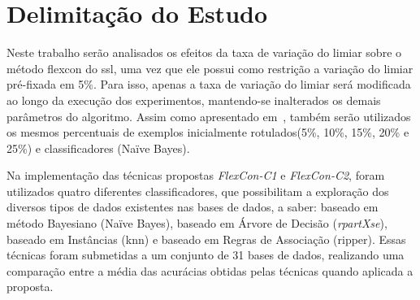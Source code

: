 \section{Delimitação do Estudo}
    \label{sec:delimitacao-estudo}


    Neste trabalho serão analisados os efeitos da taxa de variação do limiar sobre o método \ac{flexcon} do \ac{ssl}, uma vez que ele possui como restrição a variação do limiar pré\hyp{fixada} em 5\%. Para isso, apenas a taxa de variação do limiar será modificada ao longo da execução dos experimentos, mantendo-se inalterados os demais parâmetros do algoritmo. Assim como apresentado em~, também serão utilizados os mesmos percentuais de exemplos inicialmente rotulados(5\%, 10\%, 15\%, 20\% e 25\%) e classificadores (Na\"ive Bayes).

   Na implementação das técnicas propostas \textit{FlexCon\hyp{C1}} e \textit{FlexCon\hyp{C2}}, foram utilizados quatro diferentes classificadores, que possibilitam a exploração dos diversos tipos de dados existentes nas bases de dados, a saber: baseado em método Bayesiano (Na\"ive Bayes), baseado em Árvore de Decisão (\textit{rpartXse}), baseado em Instâncias (\ac{knn}) e baseado em Regras de Associação (\ac{ripper}). Essas técnicas foram submetidas a um conjunto de 31 bases de dados, realizando uma comparação entre a média das acurácias obtidas pelas técnicas quando aplicada a proposta.
